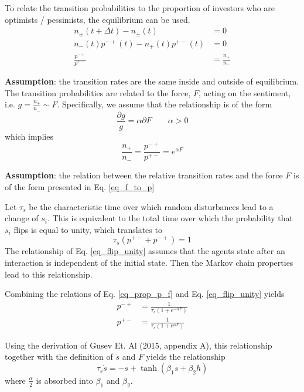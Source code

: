 \documentclass[11pt]{article}
\begin{document}
To relate the transition probabilities to the proportion of investors who are optimists / pessimists, the equilibrium can be used.
\begin{align}
n_\pm(t+\Delta t) - n_\pm(t)&= 0\\
n_-(t) p^{-+}(t) - n_+(t) p^{+-}(t) &= 0\\
\frac{p^{-+}}{p^{+-}} &= \frac{n_+}{n_-}\label{eq_eq_relation}
\end{align}

\textbf{Assumption}: the transition rates are the same inside and outside of equilibrium.\\

The transition probabilities are related to the force, $F$, acting on the sentiment, i.e. $g = \frac{n_+}{n_-}\sim F$. Specifically, we assume that the relationship is of the form
\begin{equation}\label{eq_f_to_p}
\frac{\partial g}{g}=\alpha\partial F\quad\quad \alpha>0
\end{equation}
which implies
\begin{equation}\label{eq_prop_p_f}
\frac{n_+}{n_-}= \frac{p^{-+}}{p^{+-}} = e^{\alpha F}
\end{equation}

\textbf{Assumption}: the relation between the relative transition rates and the force $F$ is of the form presented in Eq. \eqref{eq_f_to_p}

Let $\tau_s$ be the characteristic time over which random disturbances lead to a change of $s_i$. This is equivalent to the total time over which the probability that $s_i$ flips is equal to unity, which translates to
\begin{equation}\label{eq_flip_unity}
\tau_s (p^{+-} + p^{-+}) = 1
\end{equation}
The relationship of Eq. \eqref{eq_flip_unity} assumes that the agents state after an interaction is independent of the initial state. Then the Markov chain properties lead to this relationship.

Combining the relations of Eq. \eqref{eq_prop_p_f} and Eq. \eqref{eq_flip_unity} yields
\begin{align}
p^{-+} &= \frac{1}{\tau_s\left( 1 + e^{-\alpha F}\right)}\\
p^{+-} &= \frac{1}{\tau_s\left( 1 + e^{\alpha F}\right)}
\end{align}

Using the derivation of Gusev Et. Al (2015, appendix A), this relationship together with the definition of $\dot{s}$ and $F$ yields the relationship
\begin{equation}
\tau_s \dot{s}=-s + \tanh( \beta_1 s + \beta_2 h) 
\end{equation}
where $\frac{\alpha}{2}$ is absorbed into $\beta_1$ and $\beta_2$. 
\end{document}

